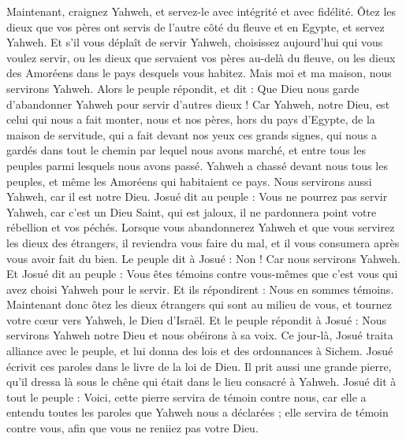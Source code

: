 \begin{multicols}{2}
Maintenant, craignez Yahweh, et servez-le avec intégrité et avec fidélité. Ôtez les dieux que vos pères ont servis de l'autre côté du fleuve et en Egypte, et servez Yahweh.
Et s'il vous déplaît de servir Yahweh, choisissez aujourd'hui qui vous voulez servir, ou les dieux que servaient vos pères au-delà du fleuve, ou les dieux des Amoréens dans le pays desquels vous habitez. Mais moi et ma maison, nous servirons Yahweh.
Alors le peuple répondit, et dit : Que Dieu nous garde d'abandonner Yahweh pour servir d'autres dieux !
Car Yahweh, notre Dieu, est celui qui nous a fait monter, nous et nos pères, hors du pays d'Egypte, de la maison de servitude, qui a fait devant nos yeux ces grands signes, qui nous a gardés dans tout le chemin par lequel nous avons marché, et entre tous les peuples parmi lesquels nous avons passé.
Yahweh a chassé devant nous tous les peuples, et même les Amoréens qui habitaient ce pays. Nous servirons aussi Yahweh, car il est notre Dieu.
Josué dit au peuple : Vous ne pourrez pas servir Yahweh, car c'est un Dieu Saint, qui est jaloux, il ne pardonnera point votre rébellion et vos péchés.
Lorsque vous abandonnerez Yahweh et que vous servirez les dieux des étrangers, il reviendra vous faire du mal, et il vous consumera après vous avoir fait du bien.
Le peuple dit à Josué : Non ! Car nous servirons Yahweh.
Et Josué dit au peuple : Vous êtes témoins contre vous-mêmes que c'est vous qui avez choisi Yahweh pour le servir. Et ils répondirent : Nous en sommes témoins.
Maintenant donc ôtez les dieux étrangers qui sont au milieu de vous, et tournez votre cœur vers Yahweh, le Dieu d'Israël.
Et le peuple répondit à Josué : Nous servirons Yahweh notre Dieu et nous obéirons à sa voix.
Ce jour-là, Josué traita alliance avec le peuple, et lui donna des lois et des ordonnances à Sichem.
Josué écrivit ces paroles dans le livre de la loi de Dieu. Il prit aussi une grande pierre, qu'il dressa là sous le chêne qui était dans le lieu consacré à Yahweh.
Josué dit à tout le peuple : Voici, cette pierre servira de témoin contre nous, car elle a entendu toutes les paroles que Yahweh nous a déclarées ; elle servira de témoin contre vous, afin que vous ne reniiez pas votre Dieu.

\end{multicols}
